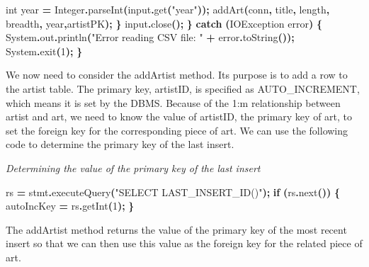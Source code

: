 \documentclass[
]{article}
\newenvironment{Shaded}{\begin{snugshade}}{\end{snugshade}}
\newcommand{\BuiltInTok}[1]{#1}
\newcommand{\ControlFlowTok}[1]{\textcolor[rgb]{0.13,0.29,0.53}{\textbf{#1}}}
\newcommand{\DataTypeTok}[1]{\textcolor[rgb]{0.13,0.29,0.53}{#1}}
\newcommand{\DecValTok}[1]{\textcolor[rgb]{0.00,0.00,0.81}{#1}}
\newcommand{\FunctionTok}[1]{\textcolor[rgb]{0.00,0.00,0.00}{#1}}
\newcommand{\NormalTok}[1]{#1}
\newcommand{\OperatorTok}[1]{\textcolor[rgb]{0.81,0.36,0.00}{\textbf{#1}}}
\newcommand{\StringTok}[1]{\textcolor[rgb]{0.31,0.60,0.02}{#1}}
\begin{document}
\begin{Shaded}
\begin{Highlighting}[]
        \DataTypeTok{int}\NormalTok{ year }\OperatorTok{=} \BuiltInTok{Integer}\OperatorTok{.}\FunctionTok{parseInt}\OperatorTok{(}\NormalTok{input}\OperatorTok{.}\FunctionTok{get}\OperatorTok{(}\StringTok{"year"}\OperatorTok{));}
        \FunctionTok{addArt}\OperatorTok{(}\NormalTok{conn}\OperatorTok{,}\NormalTok{ title}\OperatorTok{,}\NormalTok{ length}\OperatorTok{,}\NormalTok{ breadth}\OperatorTok{,}\NormalTok{ year}\OperatorTok{,}\NormalTok{artistPK}\OperatorTok{);}
    \OperatorTok{\}}
\NormalTok{input}\OperatorTok{.}\FunctionTok{close}\OperatorTok{();}
\OperatorTok{\}} \ControlFlowTok{catch} \OperatorTok{(}\BuiltInTok{IOException}\NormalTok{ error}\OperatorTok{)} \OperatorTok{\{}
    \BuiltInTok{System}\OperatorTok{.}\FunctionTok{out}\OperatorTok{.}\FunctionTok{println}\OperatorTok{(}\StringTok{"Error reading CSV file: "} \OperatorTok{+}\NormalTok{ error}\OperatorTok{.}\FunctionTok{toString}\OperatorTok{());}
    \BuiltInTok{System}\OperatorTok{.}\FunctionTok{exit}\OperatorTok{(}\DecValTok{1}\OperatorTok{);}
\OperatorTok{\}}
\end{Highlighting}
\end{Shaded}

We now need to consider the addArtist method. Its purpose is to add a
row to the artist table. The primary key, artistID, is specified as
AUTO\_INCREMENT, which means it is set by the DBMS. Because of the 1:m
relationship between artist and art, we need to know the value of
artistID, the primary key of art, to set the foreign key for the
corresponding piece of art. We can use the following code to determine
the primary key of the last insert.

\emph{Determining the value of the primary key of the last insert}

\begin{Shaded}
\begin{Highlighting}[]
\NormalTok{rs }\OperatorTok{=}\NormalTok{ stmt}\OperatorTok{.}\FunctionTok{executeQuery}\OperatorTok{(}\StringTok{"SELECT LAST\_INSERT\_ID()"}\OperatorTok{);}
    \ControlFlowTok{if} \OperatorTok{(}\NormalTok{rs}\OperatorTok{.}\FunctionTok{next}\OperatorTok{())} \OperatorTok{\{}
\NormalTok{        autoIncKey }\OperatorTok{=}\NormalTok{ rs}\OperatorTok{.}\FunctionTok{getInt}\OperatorTok{(}\DecValTok{1}\OperatorTok{);}
    \OperatorTok{\}}
\end{Highlighting}
\end{Shaded}

The addArtist method returns the value of the primary key of the most
recent insert so that we can then use this value as the foreign key for
the related piece of art.
\end{document}
